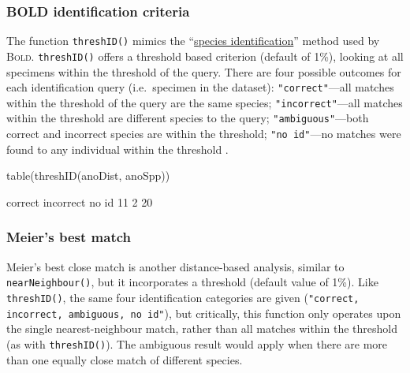 \documentclass{article}
\newcommand{\progname}[1]{\textsc{#1}}
\newcommand{\fun}[1]{\texttt{#1}}
\begin{document}
\subsubsection{BOLD identification criteria}%
The function \fun{threshID()} mimics the ``\href{http://www.barcodinglife.com/views/idrequest.php}{species identification}'' method used by \progname{Bold}. \fun{threshID()} offers a threshold based criterion (default of 1\%), looking at all specimens within the threshold of the query. There are four possible outcomes for each identification query (i.e.\ specimen in the dataset): \fun{"correct"}---all matches within the threshold of the query are the same species; \fun{"incorrect"}---all matches within the threshold are different species to the query; \fun{"ambiguous"}---both correct and incorrect species are within the threshold; \fun{"no id"}---no matches were found to any individual within the threshold . 

\begin{console}
table(threshID(anoDist, anoSpp))
\end{console}

\begin{Routput}
  correct incorrect     no id 
       11         2        20 
\end{Routput}

\subsubsection{Meier's best match}
Meier's best close match \citep{Meier.2006} is another distance-based analysis, similar to \fun{nearNeighbour()}, but it incorporates a threshold (default value of 1\%). Like \fun{threshID()}, the same four identification categories are given (\fun{"correct, incorrect, ambiguous, no id"}), but critically, this function only operates upon the single nearest-neighbour match, rather than all matches within the threshold (as with \fun{threshID()}). The ambiguous result would apply when there are more than one equally close match of different species. 

\end{document}
